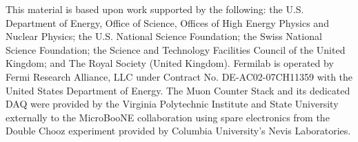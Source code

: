 \documentclass[a4paper,11pt]{article}
\begin{document}
\clearpage{}

\acknowledgments

This material is based upon work supported by the following: the U.S. Department of Energy, Office of Science, Offices of High Energy Physics and Nuclear Physics; the U.S. National Science Foundation; the Swiss National Science Foundation; the Science and Technology Facilities Council of the United Kingdom; and The Royal Society (United Kingdom). Fermilab is operated by Fermi Research Alliance, LLC under Contract No. DE-AC02-07CH11359 with the United States Department of Energy. The Muon Counter Stack and its dedicated DAQ were provided by the Virginia Polytechnic Institute and State University externally to the MicroBooNE collaboration using spare electronics from the Double Chooz experiment provided by Columbia University's Nevis Laboratories.
\end{document}
